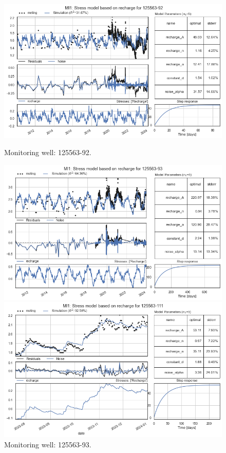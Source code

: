 \begin{figure}[htbp]
    \centering
    \begin{minipage}{0.32\textwidth}
        \centering
        \includegraphics[width=\linewidth]{frontmatter/Heijplaat-fig/10.png}
        \caption{Monitoring well: 125563-92.}
        \label{SM: 125563-92}
    \end{minipage}
    \hfill
    \begin{minipage}{0.32\textwidth}
        \centering
        \includegraphics[width=\linewidth]{frontmatter/Heijplaat-fig/11.png}
        \caption{Monitoring well: 125563-93.}
        \label{SM: 125563-93}
    \end{minipage}
    \hfill
    \begin{minipage}{0.32\textwidth}
        \centering
        \includegraphics[width=\linewidth]{frontmatter/Heijplaat-fig/12.png}

\end{minipage}
\end{figure}
